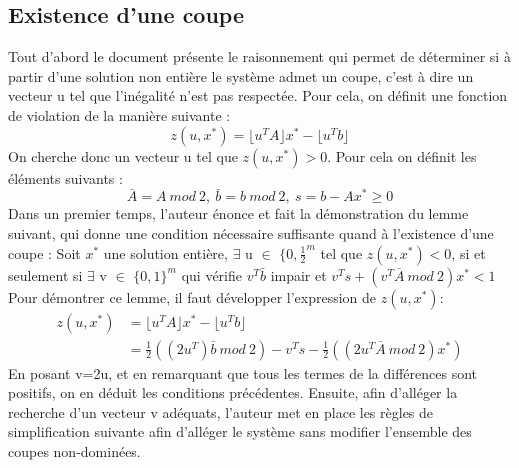 \documentclass[12pt]{report}
\begin{document}
\subsection{Existence d'une coupe}
Tout d'abord le document présente le raisonnement qui permet de déterminer si à partir d'une solution non entière le système admet un coupe, c'est à dire un vecteur u tel que l'inégalité n'est pas respectée. Pour cela, on définit une fonction de violation de la manière suivante :
$$
z(u,x^\ast)=\lfloor u^TA \rfloor x^\ast-\lfloor u^Tb \rfloor
$$
On cherche donc un vecteur u tel que $z(u,x^\ast)>0$.
Pour cela on définit les éléments suivants :
$$
\overset{\_}{A}=A \ mod \ 2, \ \overset{\_}{b}=b \ mod \ 2,\ s = b-Ax^\ast \ge 0
$$
Dans un premier temps, l'auteur énonce et fait la démonstration du lemme suivant, qui donne une condition nécessaire suffisante quand à l'existence d'une coupe :
\newline
\newline
Soit $x^\ast$ une solution entière, $\exists$ u $\in$ $\{0,\frac{1}{2}^m$ tel que $z(u,x^\ast)<0$, si et seulement si $\exists$ v $\in$ $\{0,1\}^m$ qui vérifie $v^T\overset{\_}{b}$ impair et $v^Ts+(v^T\overset{\_}{A}\ mod\ 2)x^\ast < 1 $
\newline
\newline
Pour démontrer ce lemme, il faut développer l'expression de $z(u,x^\ast)$:
\newline
\begin{equation}
\begin{split}
z(u,x^\ast) & =\lfloor u^TA \rfloor x^\ast-\lfloor u^Tb \rfloor \\
 & = \frac{1}{2}((2u^T)\overset{\_}{b}\ mod\ 2) -v^Ts-\frac{1}{2}((2u^T\overset{\_}{A}\ mod \ 2)x^\ast)
\end{split}
\end{equation}
En posant v=2u, et en remarquant que tous les termes de la différences sont positifs, on en déduit les conditions précédentes.
\newline
Ensuite, afin d'alléger la recherche d'un vecteur v adéquats, l'auteur met en place les règles de simplification suivante afin d'alléger le système sans modifier l'ensemble des coupes non-dominées.
\end{document}

